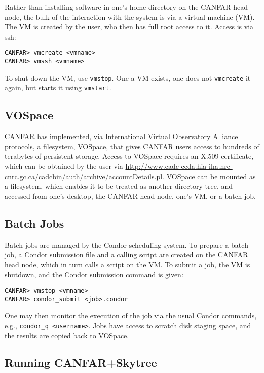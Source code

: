 Rather than installing software in one's home directory on the CANFAR head node, the bulk of the interaction with the system is via a virtual machine (VM). The VM is created by the user, who then has full root access to it. Access is via ssh:

\begin{verbatim}
CANFAR> vmcreate <vmname>
CANFAR> vmssh <vmname>
\end{verbatim}

To shut down the VM, use {\tt vmstop}. One a VM exists, one does not {\tt vmcreate} it again, but starts it using {\tt vmstart}.

\subsection{VOSpace}

CANFAR has implemented, via International Virtual Observatory Alliance protocols, a filesystem, VOSpace, that gives CANFAR users access to hundreds of terabytes of persistent storage. Access to VOSpace requires an X.509 certificate, which can be obtained by the user via \url{http://www.cadc-ccda.hia-iha.nrc-cnrc.gc.ca/cadcbin/auth/archive/accountDetails.pl}. VOSpace can be mounted as a filesystem, which enables it to be treated as another directory tree, and accessed from one's desktop, the CANFAR head node, one's VM, or a batch job.

\subsection{Batch Jobs}

Batch jobs are managed by the Condor scheduling system. To prepare a batch job, a Condor submission file and a calling script are created on the CANFAR head node, which in turn calls a script on the VM. To submit a job, the VM is shutdown, and the Condor submission command is given:

\begin{verbatim}
CANFAR> vmstop <vmname>
CANFAR> condor_submit <job>.condor
\end{verbatim}

One may then monitor the execution of the job via the usual Condor commands, e.g., {\tt condor\_q <username>}. Jobs have access to scratch disk staging space, and the results are copied back to VOSpace.

\subsection{Running CANFAR+Skytree}

